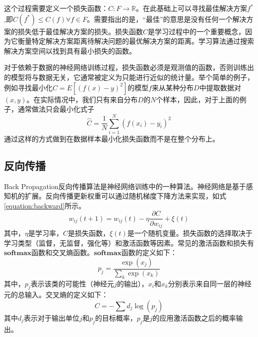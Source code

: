 这个过程需要定义一个损失函数：$C : F \rightarrow \mathbb{R}$。在此基础上可以寻找最佳解决方案$f^*$,即$C\left(f^{*}\right) \leq C(f) \forall f \in F$。需要指出的是，“最佳”的意思是没有任何一个解决方案的损失低于最佳解决方案的损失。损失函数$C$是学习过程中的一个重要概念，因为它衡量特定解决方案距离待解决问题的最优解决方案的距离。学习算法通过搜索解决方案空间以找到具有最小损失的函数。

对于依赖于数据的神经网络训练过程，损失函数必须是观测值的函数，否则训练出的模型将与数据无关，它通常被定义为只能进行近似的统计量。举个简单的例子，例如寻找最小化$C=E\left[(f(x)-y)^{2}\right]$的模型$f$来从某种分布$D$中提取数据对$(x,y)$。在实际情况中，我们只有来自分布$D$的$N$个样本，因此，对于上面的例子，通常做法只会最小化式子\begin{equation}\hat{C}=\frac{1}{N} \sum_{i=1}^{N}\left(f\left(x_{i}\right)-y_{i}\right)^{2}\end{equation}通过这样的方式做到在数据样本最小化损失函数而不是在整个分布上。

\subsection{反向传播}{Back Propagation}\cite{ wiki:Artificial_neural_network}反向传播算法是神经网络训练中的一种算法。神经网络是基于感知机的扩展。反向传播更新权重可以通过随机梯度下降方法来实现，如式\ref{equation:backward}所示。
\begin{equation}
  \label{equation:backward}
  w_{i j}(t+1)=w_{i j}(t)-\eta \frac{\partial C}{\partial w_{i j}}+\xi(t)
\end{equation}
其中，$\eta$是学习率，$C$是损失函数，$\xi(t)$是一个随机变量。损失函数的选择取决于学习类型（监督，无监督，强化等）和激活函数等因素。常见的激活函数和损失有$\mathbf{softmax}$函数和交叉熵函数。$\mathbf{softmax}$函数的定义如下：
\begin{equation}
  p_{j}=\frac{\exp \left(x_{j}\right)}{\sum_{k} \exp \left(x_{k}\right)}
\end{equation}其中，$p_j$表示该类的可能性（神经元$j$的输出），$x_i$和$x_k$分别表示来自同一层的神经元的总输入。交叉熵的定义如下：
\begin{equation}
  C=-\sum d_{j} \log \left(p_{j}\right)
\end{equation}
其中$d_{j}$表示对于输出单位$j$和$p_{j}$的目标概率，$p_{j}$是$j$的应用激活函数之后的概率输出。


